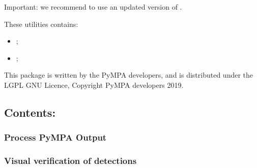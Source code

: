 \documentclass[a4paper,10pt,english]{sphinxmanual}
\begin{document}
Important: we recommend to use an updated version of .

These utilities contains:
\begin{itemize}
\item {} 
{\hyperref[\detokenize{sub/output.process_detections::doc}]{}};

\item {} 
{\hyperref[\detokenize{sub/output.verify_detection::doc}]{}};

\end{itemize}

This package is written by the PyMPA developers, and is distributed under the LGPL GNU Licence, Copyright PyMPA developers 2019.


\subsection{Contents:}
\label{\detokenize{output:contents}}

\subsubsection{Process PyMPA Output}
\label{\detokenize{sub/output.process_detections:process-pympa-output}}\label{\detokenize{sub/output.process_detections::doc}}

\subsubsection{Visual verification of detections}
\label{\detokenize{sub/output.verify_detection:visual-verification-of-detections}}\label{\detokenize{sub/output.verify_detection::doc}}


\renewcommand{\indexname}{Index}
\printindex
\end{document}
